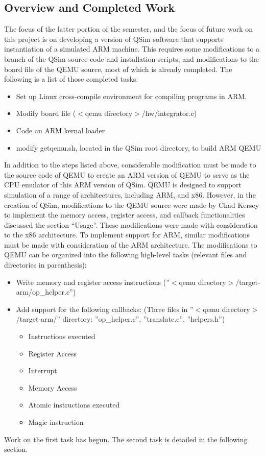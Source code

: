 \documentclass[letterpaper,10pt,twocolumn]{article}
\begin{document}
\subsection{Overview and Completed Work}
The focus of the latter portion of the semester, and the focus of future work on this project is on developing a version of QSim software that supports instantiation of a simulated ARM machine.  This requires some modifications to a branch of the QSim source code and installation scripts, and modifications to the board file of the QEMU source, most of which is already completed. The following is a list of those completed tasks:
\begin{itemize}
  \item{Set up Linux cross-compile environment for compiling programs in ARM.}
  \item{Modify board file ($<$qemu directory$>$/hw/integrator.c)}
  \item{Code an ARM kernal loader}
  \item{modify getqemu.sh, located in the QSim root directory, to build ARM QEMU}
\end{itemize}
In addition to the steps listed above, considerable modification must be made to the source code of QEMU to create an ARM version of QEMU to serve as the CPU emulator of this ARM version of QSim. QEMU is designed to support simulation of a range of architectures, including ARM, and x86. However, in the creation of QSim, modifications to the QEMU source were made by Chad Kersey to implement the memory access, register access, and callback functionalities discussed the section “Usage”. These modifications were made with consideration to the x86 architecture. To implement support for ARM, similar modifications must be made with consideration of the ARM architecture.  The modifications to QEMU can be organized into the following high-level tasks (relevant files and directories in parenthesis):
\begin{itemize}
	\item{Write memory and register access instructions (''$<$qemu directory$>$/target-arm/op\_helper.c'')}
	\item{Add support for the following callbacks:
	(Three files in ''$<$qemu directory$>$/target-arm/'' directory: ''op\_helper.c'', ''translate.c'', ''helpers.h'')
		\begin{itemize}
		\item{Instructions executed}
		\item{Register Access}
		\item{Interrupt}
		\item{Memory Access}
		\item{Atomic instructions executed}
		\item{Magic instruction}
		\end{itemize}
	}
\end{itemize}
Work on the first task has begun. The second task is detailed in the following section.
\end{document}
